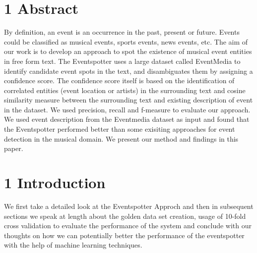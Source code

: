 \documentclass[a4paper,11pt]{report}
\begin{document}
\chapter*{1 Abstract}
By definition, an event is an occurrence in the past, present or future. Events could be classified as musical events, sports events, news events, etc. The aim of our work is to develop an approach to spot the existence of musical event entities in free form text. The Eventspotter uses a large dataset called EventMedia to identify candidate event spots in the text, and disambiguates them by assigning a confidence score. The confidence score itself is based on the identification of correlated entities (event location or artists) in the surrounding text and cosine similarity measure between the surrounding text and existing description of event in the dataset. We used precision, recall and f-measure to evaluate our approach. We used event description from the Eventmedia dataset as input and found that the Eventspotter performed better than some exisiting approaches for event detection in the musical domain. We present our method and findings in this paper.

\chapter*{1 Introduction}
We first take a detailed look at the Eventspotter Approch and then in subsequent sections we speak at length about the golden data set creation, usage of 10-fold cross validation to evaluate the performance of the system and conclude with our thoughts on how we can potentially better the performance of the eventspotter with the help of machine learning techniques.

\end{document}
